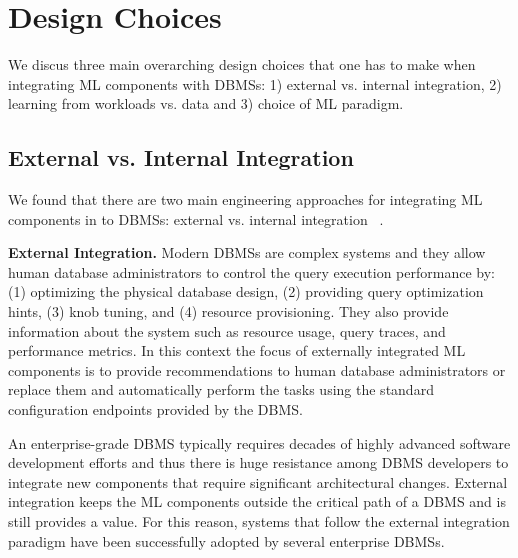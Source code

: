 \section{Design Choices}

We discus three main overarching design choices that one has to make when integrating ML components with DBMSs: 1) external vs. internal integration, 2)  learning from workloads vs. data and 3) choice of ML paradigm.


\subsection{External vs. Internal Integration}
We found that there are two main engineering approaches for integrating ML components in to DBMSs: external vs. internal integration ~\cite{pavlo2019external}.

\vspace{2mm}
\noindent \textbf{External Integration.} Modern DBMSs are complex systems and they allow human database administrators to control the query execution performance by: (1) optimizing the physical database design, (2) providing query optimization hints, (3) knob tuning, and (4) resource provisioning.
They also provide information about the system such as resource usage, query traces, and performance metrics.
In this context the focus of externally integrated ML components is to provide recommendations to human database administrators or replace them and automatically perform the tasks using the standard configuration endpoints provided by the DBMS.

An enterprise-grade DBMS typically requires decades of highly advanced software development efforts and thus there is huge resistance among DBMS developers to integrate new components that require significant architectural changes.
External integration keeps the ML components outside the critical path of a DBMS and is still provides a value.
For this reason, systems that follow the external integration paradigm have been successfully adopted by several enterprise DBMSs.

